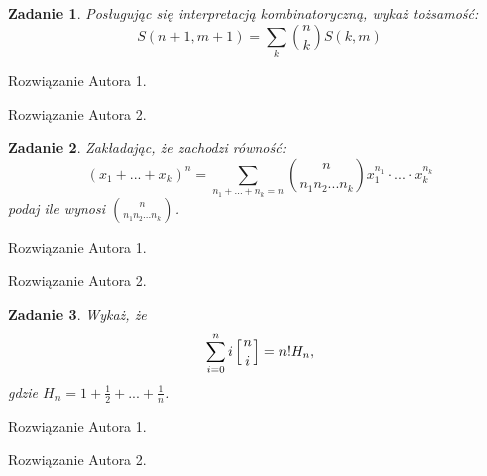\documentclass{mwart}
\newtheorem{zad}{Zadanie}[section]
\begin{document}
\begin{zad}
    Posługując się interpretacją kombinatoryczną, wykaż tożsamość:
    \[S(n+1,m+1) = \sum_k \binom{n}{k}S(k,m)\]
\end{zad}
\begin{mdframed}
    Rozwiązanie Autora 1.
\end{mdframed}
\begin{mdframed}
    Rozwiązanie Autora 2.
\end{mdframed}




\begin{zad}
    Zakładając, że zachodzi równość:
    \[
        (x_1 + ... + x_k)^n = \sum_{n_1+...+n_k=n}\binom{n}{n_1 n_2 ... n_k}x_1^{n_1}\cdot...\cdot x_k^{n_k}
    \]
    podaj ile wynosi $\binom{n}{n_1 n_2 ... n_k}$.
\end{zad}
\begin{mdframed}
    Rozwiązanie Autora 1.
\end{mdframed}
\begin{mdframed}
    Rozwiązanie Autora 2.
\end{mdframed}




\begin{zad}
    Wykaż, że
    \[
        \sum_{i=0}^{n} i \left[ n \atop i \right] = n! H_n,
    \]
    gdzie $H_n = 1 + \frac{1}{2} + ... + \frac{1}{n}$.
\end{zad}
\begin{mdframed}
    Rozwiązanie Autora 1.
\end{mdframed}
\begin{mdframed}
    Rozwiązanie Autora 2.
\end{mdframed}
\end{document}

